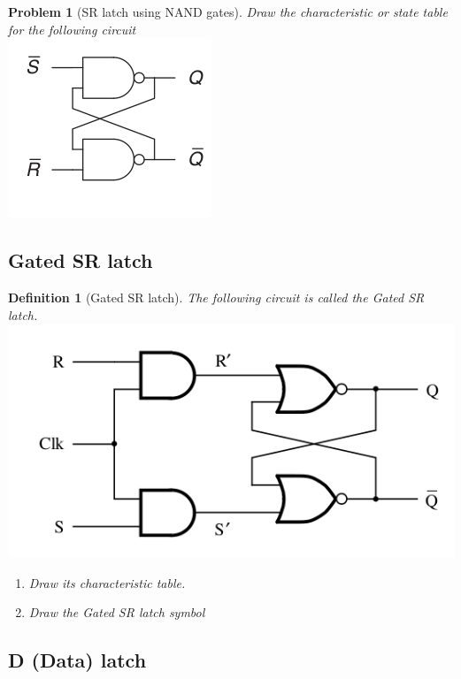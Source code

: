 \documentclass{article}
\newtheorem{prob}{Problem}
\newtheorem{definition}{Definition}
\begin{document}
\begin{prob}[SR latch using NAND gates]
Draw the characteristic or state table for the following circuit\\
  \includegraphics[width=0.3\linewidth]{./fig/fig3.65-SR-NAND-latch.png} \\
\end{prob}

\subsection{Gated SR latch \cite[Sec~5.2]{stephen2022fundamentals}}

\begin{definition}[Gated SR latch]
  The following circuit is called the Gated SR latch. \\
  \includegraphics[width=0.6\linewidth]{./fig/gated-SR-latch.png} \\
  \begin{enumerate}
  \item Draw its characteristic table.
  \item Draw the Gated SR latch symbol
  \end{enumerate}
\end{definition}
\vspace{20em}

\subsection{D (Data) latch \cite[Sec~3.2.2]{harris2022digital}}
\end{document}
